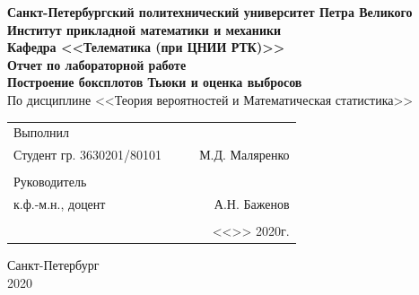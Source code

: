 \documentclass[12pt]{article}
\begin{document}
\begin{titlepage}
	\begin{center}
		\hfill \break
		{\textbf{Санкт-Петербургский политехнический университет Петра Великого}}\\
		\hfill \break
		\textbf{Институт прикладной математики и механики}\\
		 \hfill \break
		\textbf{Кафедра <<Телематика (при ЦНИИ РТК)>>}\\
		\vfill
		\large{\bfseries Отчет по лабораторной работе}\\
		\hfill \break
		\hfill \break
		\hfill \break
		\hfill \break
		\normalsize{\bfseries Построение боксплотов Тьюки и оценка выбросов}\\
		По дисциплине <<Теория вероятностей и Математическая статистика>>\\
		\hfill \break
		\hfill \break
		\hfill \break
	\end{center}
 
	\normalsize
	{ 
		\begin{tabular}{lp{2cm}cr}
			Выполнил &&&\\
			Студент гр. 3630201/80101&&\underline{\hspace{1.5cm}}& М.Д. Маляренко\\\\
			Руководитель&&&\\ 
			к.ф.-м.н., доцент && \underline{\hspace{1.5cm}}& А.Н. Баженов \\\\
			&&&<<\underline{\phantom{333}}>>\underline{\phantom{сентября000}}
			2020г.
		\end{tabular}
	}
\vfill

\begin{center} Санкт-Петербург \\2020 \end{center}
\end{titlepage}

\newpage

\setcounter{page}{2}
\end{document}

